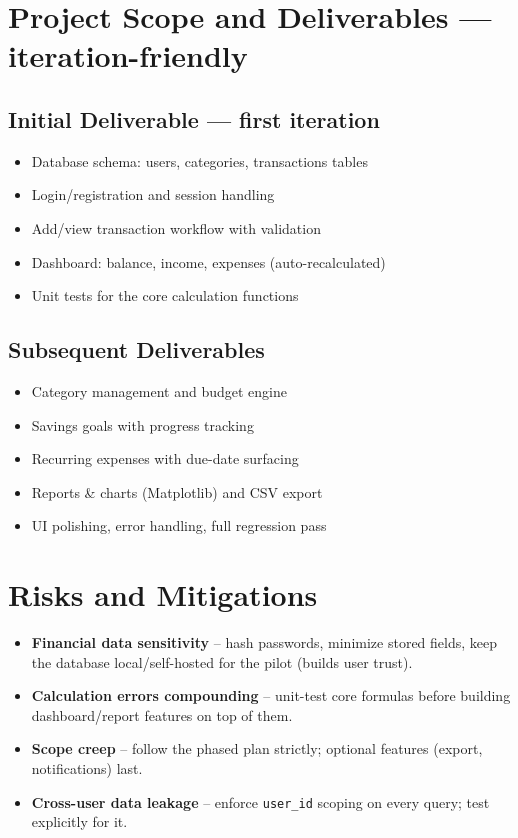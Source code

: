 \documentclass{article}
\begin{document}
\section{Project Scope and Deliverables --- iteration-friendly}
\subsection{Initial Deliverable --- first iteration}
\begin{itemize}[noitemsep]
  \item Database schema: users, categories, transactions tables
  \item Login/registration and session handling
  \item Add/view transaction workflow with validation
  \item Dashboard: balance, income, expenses (auto-recalculated)
  \item Unit tests for the core calculation functions
\end{itemize}

\subsection{Subsequent Deliverables}
\begin{itemize}[noitemsep]
  \item Category management and budget engine
  \item Savings goals with progress tracking
  \item Recurring expenses with due-date surfacing
  \item Reports \& charts (Matplotlib) and CSV export
  \item UI polishing, error handling, full regression pass
\end{itemize}

\section{Risks and Mitigations}
\begin{itemize}[noitemsep]
  \item \textbf{Financial data sensitivity} -- hash passwords, minimize stored fields, keep the database local/self-hosted for the pilot (builds user trust).
  \item \textbf{Calculation errors compounding} -- unit-test core formulas before building dashboard/report features on top of them.
  \item \textbf{Scope creep} -- follow the phased plan strictly; optional features (export, notifications) last.
  \item \textbf{Cross-user data leakage} -- enforce \texttt{user\_id} scoping on every query; test explicitly for it.
\end{itemize}
\end{document}
